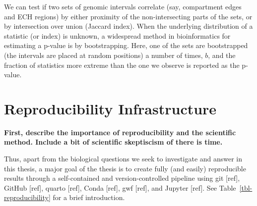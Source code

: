 \documentclass[
  11pt,
  a4paper,
]{scrbook}
\begin{document}
We can test if two sets of genomic intervals correlate (say, compartment
edges and ECH regions) by either proximity of the non-intersecting parts
of the sets, or by intersection over union (Jaccard index). When the
underlying distribution of a statistic (or index) is unknown, a
widespread method in bioinformatics for estimating a p-value is by
bootstrapping. Here, one of the sets are bootstrapped (the intervals are
placed at random positions) a number of times, \(b\), and the fraction
of statistics more extreme than the one we observe is reported as the
p-value.

\section{Reproducibility
Infrastructure}\label{reproducibility-infrastructure}

\textbf{First, describe the importance of reproducibility and the
scientific method. Include a bit of scientific skeptiscism of there is
time.}

Thus, apart from the biological questions we seek to investigate and
answer in this thesis, a major goal of the thesis is to create fully
(and easily) reproducible results through a self-contained and
version-controlled pipeline using git {[}ref{]}, GitHub {[}ref{]},
quarto {[}ref{]}, Conda {[}ref{]}, gwf {[}ref{]}, and Jupyter {[}ref{]}.
See Table~\ref{tbl-reproducibility} for a brief introduction.

\small
\end{document}
